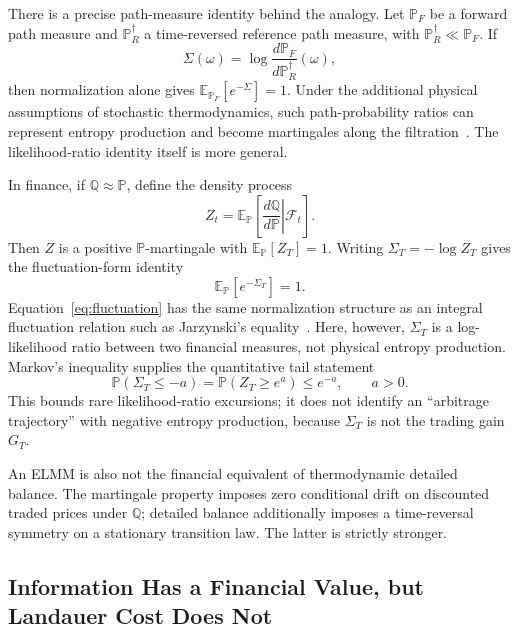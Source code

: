 \documentclass[aps,pra,reprint,superscriptaddress,amsmath,amssymb,floatfix]{revtex4-2}
\theoremstyle{plain}
\theoremstyle{definition}
\theoremstyle{remark}
\begin{document}
There is a precise path-measure identity behind the analogy. Let
\(\mathbb{P}_{F}\) be a forward path measure and
\(\mathbb{P}_{R}^{\dagger}\) a time-reversed reference path measure, with
\(\mathbb{P}_{R}^{\dagger}\ll\mathbb{P}_{F}\). If
\[
  \Sigma(\omega)
  =\log\frac{d\mathbb{P}_{F}}{d\mathbb{P}_{R}^{\dagger}}(\omega),
\]
then normalization alone gives
\(\mathbb{E}_{\mathbb{P}_{F}}[e^{-\Sigma}]=1\). Under the additional physical
assumptions of stochastic thermodynamics, such path-probability ratios can
represent entropy production and become martingales along the
filtration~\cite{RoldanEtAl2023}. The likelihood-ratio identity itself is more
general.

In finance, if \(\mathbb{Q}\approx\mathbb{P}\), define the density process
\begin{equation}
  Z_t=\mathbb{E}_{\mathbb{P}}\!\left[
    \left.\frac{d\mathbb{Q}}{d\mathbb{P}}\right|\mathcal{F}_t
  \right].
  \label{eq:density}
\end{equation}
Then \(Z\) is a positive \(\mathbb{P}\)-martingale with
\(\mathbb{E}_{\mathbb{P}}[Z_T]=1\). Writing
\(\Sigma_T=-\log Z_T\) gives the fluctuation-form identity
\begin{equation}
  \mathbb{E}_{\mathbb{P}}\!\left[e^{-\Sigma_T}\right]=1.
  \label{eq:fluctuation}
\end{equation}
Equation~\eqref{eq:fluctuation} has the same normalization structure as an
integral fluctuation relation such as Jarzynski's
equality~\cite{Jarzynski1997}. Here, however, \(\Sigma_T\) is a
log-likelihood ratio between two financial measures, not physical entropy
production. Markov's inequality supplies the quantitative tail statement
\begin{equation}
  \mathbb{P}(\Sigma_T\leq-a)
  =\mathbb{P}(Z_T\geq e^a)\leq e^{-a},
  \qquad a>0.
  \label{eq:fluctuationtail}
\end{equation}
This bounds rare likelihood-ratio excursions; it does not identify an
``arbitrage trajectory'' with negative entropy production, because
\(\Sigma_T\) is not the trading gain \(G_T\).

An ELMM is also not the financial equivalent of thermodynamic detailed
balance. The martingale property imposes zero conditional drift on discounted
traded prices under \(\mathbb{Q}\); detailed balance additionally imposes a
time-reversal symmetry on a stationary transition law. The latter is strictly
stronger.

\subsection{Information Has a Financial Value, but Landauer Cost Does Not}
\end{document}
